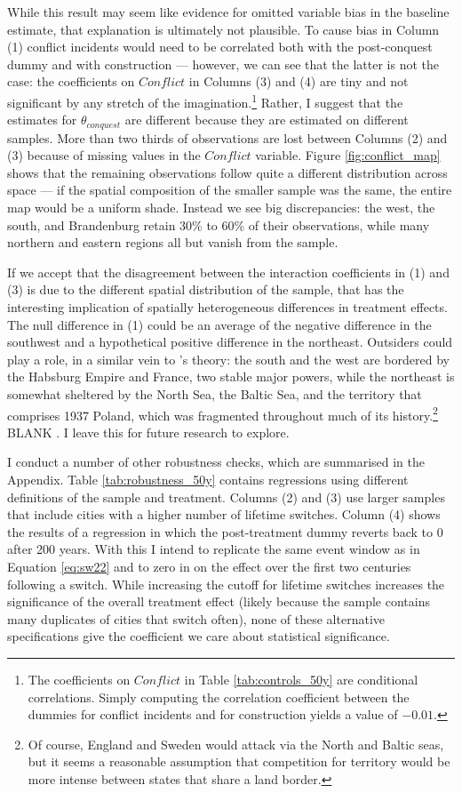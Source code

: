 \documentclass[11pt, a4paper]{article}
\begin{document}
While this result may seem like evidence for omitted variable bias in the baseline estimate, that explanation is ultimately not plausible. To cause bias in Column (1) conflict incidents would need to be correlated both with the post-conquest dummy and with construction --- however, we can see that the latter is not the case: the coefficients on $Conflict$ in Columns (3) and (4) are tiny and not significant by any stretch of the imagination.\footnote
{
The coefficients on $Conflict$ in Table \ref{tab:controls_50y} are conditional correlations. Simply computing the correlation coefficient between the dummies for conflict incidents and for construction yields a value of $-0.01$.
} 
Rather, I suggest that the estimates for $\theta_{conquest}$ are different because they are estimated on different samples. More than two thirds of observations are lost between Columns (2) and (3) because of missing values in the $Conflict$ variable. Figure \ref{fig:conflict_map} shows that the remaining observations follow quite a different distribution across space --- if the spatial composition of the smaller sample was the same, the entire map would be a uniform shade. Instead we see big discrepancies: the west, the south, and Brandenburg retain 30\% to 60\% of their observations, while many northern and eastern regions all but vanish from the sample.

If we accept that the disagreement between the interaction coefficients in (1) and (3) is due to the different spatial distribution of the sample, that has the interesting implication of spatially heterogeneous differences in treatment effects. The null difference in (1) could be an average of the negative difference in the southwest and a hypothetical positive difference in the northeast. Outsiders could play a role, in a similar vein to \cite{levine2021, levine2022}'s theory: the south and the west are bordered by the Habsburg Empire and France, two stable major powers, while the northeast is somewhat sheltered by the North Sea, the Baltic Sea, and the territory that comprises 1937 Poland, which was fragmented throughout much of its history.\footnote
{
Of course, England and Sweden would attack via the North and Baltic seas, but it seems a reasonable assumption that competition for territory would be more intense between states that share a land border.
} 
BLANK \cite{cervellati2022}. I leave this for future research to explore.

I conduct a number of other robustness checks, which are summarised in the Appendix. Table \ref{tab:robustness_50y} contains regressions using different definitions of the sample and treatment. Columns (2) and (3) use larger samples that include cities with a higher number of lifetime switches. Column (4) shows the results of a regression in which the post-treatment dummy reverts back to 0 after 200 years. With this I intend to replicate the same event window as in Equation \eqref{eq:sw22} and to zero in on the effect over the first two centuries following a switch. While increasing the cutoff for lifetime switches increases the significance of the overall treatment effect (likely because the sample contains many duplicates of cities that switch often), none of these alternative specifications give the coefficient we care about statistical significance.
\end{document}
